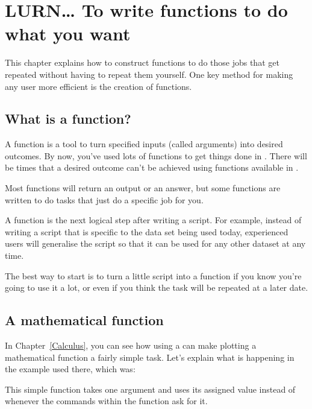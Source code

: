 

\chapter{LURN\ldots{} To write functions to do what you want} 
\label{Functions} 
 

 
This chapter explains how to construct functions to do those jobs that get repeated without having to repeat them yourself. One key method for making any \R{} user more efficient is the creation of functions.  
 
\section{What is a function?} 
 
A function is a tool to turn specified inputs (called arguments) into desired outcomes. By now, you've used lots of functions to get things done in \R{}. There will be times that a desired outcome can't be achieved using functions available in \R{}.  
 
Most functions will return an output or an answer, but some functions are written to do tasks that just do a specific job for you. 
 
A function is the next logical step after writing a script. For example, instead of writing a script that is specific to the data set being used today, experienced \R{} users will generalise the script so that it can be used for any other dataset at any time.  
  
The best way to start is to turn a little script into a function if you know you're going to use it a lot, or even if you think the task will be repeated at a later date. 
 
 
\section{A mathematical function} 
 
In Chapter~\ref{Calculus}, you can see how using a  can make plotting a mathematical function a fairly simple task. Let's explain what is happening in the example used there, which was: 
\begin{knitrout}
\color{fgcolor}\begin{kframe}
\begin{alltt}
\hlstd{> } \hlkwb{<-} \hlstd{(}\hlstd{)\{} 
\end{alltt}
\end{kframe}
\end{knitrout}
This simple function takes one argument  and uses its assigned value instead of  whenever the commands within the function ask for it. 
 
